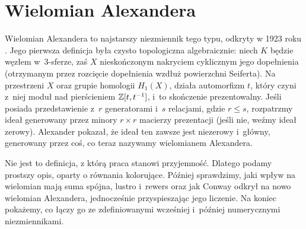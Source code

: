 
\section{Wielomian Alexandera}
%
Wielomian Alexandera to najstarszy niezmiennik tego typu, odkryty w 1923 roku \cite{alexander23}.
Jego pierwsza definicja była czysto topologiczna algebraicznie: niech $K$ będzie węzłem w~3-sferze, zaś $X$ nieskończonym nakryciem cyklicznym jego dopełnienia (otrzymanym przez rozcięcie dopełnienia wzdłuż powierzchni Seiferta).
Na przestrzeni $X$ oraz grupie homologii $H_1(X)$, działa automorfizm $t$, który czyni z~niej moduł nad pierścieniem $\mathbb Z[t, t^{-1}]$, i~to skończenie prezentowalny.
Jeśli posiada przedstawienie z~$r$ generatorami i~$s$ relacjami, gdzie $r \le s$, rozpatrzmy ideał generowany przez minory $r \times r$ macierzy prezentacji (jeśli nie, weźmy ideał zerowy).
Alexander pokazał, że ideał ten zawsze jest niezerowy i~główny, generowany przez coś, co teraz nazywamy wielomianem Alexandera.

Nie jest to definicja, z którą praca stanowi przyjemność.
Dlatego podamy prostszy opis, oparty o równania kolorujące.
Później sprawdzimy, jaki wpływ na wielomian mają suma spójna, lustro i~rewers oraz jak Conway odkrył na nowo wielomian Alexandera, jednocześnie przyspieszając jego liczenie.
Na koniec pokażemy, co łączy go ze zdefiniowanymi wcześniej i~później numerycznymi niezmiennikami.













%

